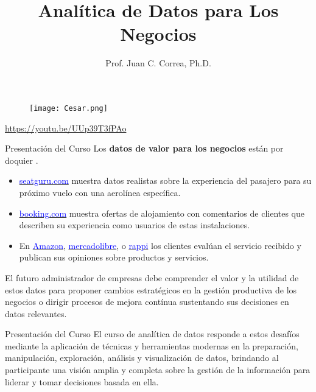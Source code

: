 \documentclass[aspectratio=169]{beamer}
\title[Analítica de Datos para los Negocios]{Analítica de Datos para Los Negocios}
\author[Prof. Juan C. Correa, Ph.D.]{Prof. Juan C. Correa, Ph.D.}
\institute[]{
Colegio de Estudios Superiores de Administración\\
Bogotá - Colombia\\
}
\date[Bogotá, Julio, 2021] %
{}
\begin{document}
\begin{frame}
\titlepage
\end{frame}


\begin{frame}
\begin{figure}
\centering
\texttt{[image: Cesar.png]}
\end{figure}
\centering
\textcolor{blue}{\url{https://youtu.be/UUp39T3fPAo}}
\end{frame}


\begin{frame}{Presentación del Curso}
Los \textbf{datos de  valor para los negocios} están por doquier \cite{Shmueli2020}.\\
\vspace{0.3cm}
\begin{itemize}
\pause
\item \href{https://www.seatguru.com/}{\textcolor{blue}{seatguru.com}} muestra datos realistas sobre la experiencia del pasajero para su próximo vuelo con una aerolínea específica.
\pause
\item \href{https://www.booking.com/}{\textcolor{blue}{booking.com}} muestra ofertas de alojamiento con comentarios de clientes que describen su experiencia como usuarios de estas instalaciones.
\pause
\item En \href{https://www.amazon.com/}{\textcolor{blue}{Amazon}}, \href{https://www.mercadolibre.com/}{\textcolor{blue}{mercadolibre}}, o \href{https://www.rappi.com/}{\textcolor{blue}{rappi}} los clientes evalúan el servicio recibido y publican sus opiniones  sobre productos y servicios. 
\end{itemize}
\pause
\vspace{0.3cm}
El futuro administrador de empresas debe comprender el valor y la utilidad de estos datos para proponer cambios estratégicos en la gestión productiva de los negocios o dirigir procesos de mejora contínua sustentando sus decisiones en datos relevantes.
\end{frame}

\begin{frame}{Presentación del Curso}
El curso de analítica de datos responde a estos desafíos mediante la aplicación de técnicas y herramientas modernas en la preparación, manipulación, exploración, análisis y visualización de datos, brindando al participante una visión amplia y completa sobre la gestión de la información para liderar y tomar decisiones basada en ella.
\end{frame}
\end{document}
